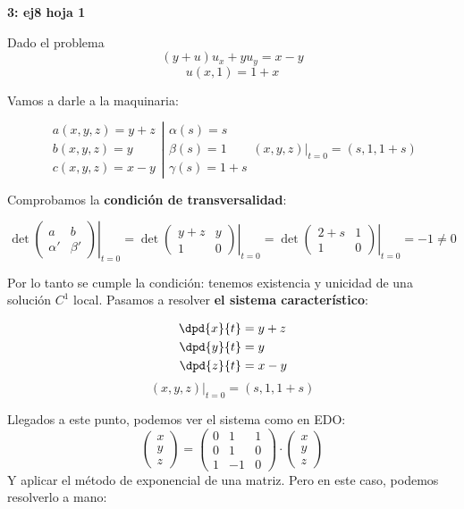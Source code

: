 	\begin{example}{\bf3: ej8 hoja 1}

		Dado el problema
		\[(y+u)u_x + y u_y = x-y \]
		\[u(x,1) = 1 + x \]

		Vamos a darle a la maquinaria:

		\[ \left. \begin{array}{r}
		a(x,y,z) = y+z \\
		b(x,y,z) = y \\
		c(x,y,z) = x-y
		\end{array} \right| \begin{array}{l}
		\alpha(s) = s \\
		\beta(s) = 1 \\
		\gamma(s) = 1+s \end{array}
		(x,y,z)|_{t=0} = (s,1,1+s)
		\]

		Comprobamos la {\bf condición de transversalidad}:

		\[ \det \left.\begin{pmatrix}
		a  & b \\
		\alpha' & \beta' \end{pmatrix}\right|_{t=0} =
		\det \left.\begin{pmatrix}
		y+z  & y \\
		1 & 0 \end{pmatrix} \right|_{t=0} =
		\det \left.\begin{pmatrix}
		2+s  & 1 \\
		1 & 0 \end{pmatrix} \right|_{t=0} = -1 \neq 0 \]

		Por lo tanto se cumple la condición: tenemos existencia y unicidad de una solución $C^1$ local. Pasamos a resolver {\bf el sistema característico}:

		\begin{align*}
			 \dpd{x}{t} &= y+z  \\
			 \dpd{y}{t} &= y \\
			 \dpd{z}{t} &= x-y
		\end{align*}
		$$(x,y,z)|_{t=0} = (s,1,1+s)$$

		Llegados a este punto, podemos ver el sistema como en EDO:
		$$
		\begin{pmatrix}
			x \\
			y \\
			z
		\end{pmatrix}
		=
		\begin{pmatrix}
			0 & 1 & 1 \\
			0 & 1 & 0 \\
			1 & -1 & 0
		\end{pmatrix}
			\cdot
		\begin{pmatrix}
			x \\
			y \\
			z
		\end{pmatrix}
		$$
		Y aplicar el método de exponencial de una matriz. Pero en este caso, podemos resolverlo a mano:


\end{example}
